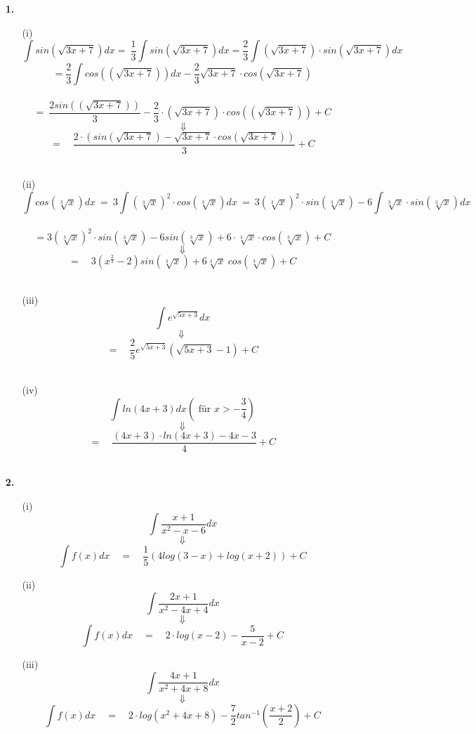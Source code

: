 \documentclass[a4paper,11pt]{article}
\title{\titleinfo}
\author{\authorinfotitle}
\date{\today}
\begin{document}
\maketitle
    \begin{enumerate}
        \item[\textbf{1.}]
         \begin{enumerate}
             \item[(i)]
            $$ \int sin \left( \sqrt{3x+7}\right)dx = \ \frac{1}{3} \int \! sin(\sqrt{3x+7})dx = \frac{2}{3} \int \! (\sqrt{3x+7}) \cdot sin (\sqrt{3x+7})dx $$$$ = \frac{2}{3} \int cos((\sqrt{3x+7}))dx - \frac{2}{3}\sqrt{3x+7} \cdot cos(\sqrt{3x+7}) $$\\$$ = \ \frac{2sin((\sqrt{3x+7}))}{3} - \frac{2}{3} \cdot (\sqrt{3x+7}) \cdot cos((\sqrt{3x+7})) + C $$$$ \ \Downarrow $$$$ = \quad \frac{2 \cdot (sin (\sqrt{3x+7})-\sqrt{3x+7} \cdot cos(\sqrt{3x+7}))}{3} + C $$ \\
            \item[(ii)]
            $$ \int cos \left( \sqrt[3]{x}\right)dx \ = \ 3 \int (\sqrt[3]{x})^2 \cdot cos(\sqrt[3]{x})dx \ = \ 3(\sqrt[3]{x})^2 \cdot sin(\sqrt[3]{x}) -6 \int \sqrt[3]{x} \cdot sin( \sqrt[3]{x})dx$$\\$$ = 3(\sqrt[3]{x})^2 \cdot sin(\sqrt[3]{x}) -6 sin(\sqrt[3]{x}) + 6 \cdot \sqrt[3]{x} \cdot cos(\sqrt[3]{x}) +C $$$$ \ \Downarrow \ $$$$ = \quad 3\left(x^{\frac{2}{3}}-2\right) sin\left(\sqrt[3]{x}\right) +6\sqrt[3]{x} \ cos\left(\sqrt[3]{x}\right) + C $$ \\
            \item[(iii)]
            $$ \int e^{\sqrt{5x+3}}dx $$$$ \Downarrow \ $$$$ = \quad \frac{2}{5}e^{\sqrt{5x+3}}(\sqrt{5x+3}-1) + C $$ \\
            \item[(iv)]
            $$ \int ln (4x+3)dx \left(\text{ für } x > - \frac{3}{4}\right)  $$$$\ \Downarrow \ $$$$  = \quad \frac{(4x+3) \cdot ln(4x+3) -4x -3}{4} + C $$ \\

         \end{enumerate}
              
        \item[\textbf{2.}]
        \begin{enumerate}
            \item[(i)]
             $$\int \frac{x+1}{x^2-x-6}dx $$$$ \Downarrow $$$$  \int f(x)dx \quad = \quad \frac{1}{5}(4log(3-x)+log(x+2)) +C $$ 
             \item[(ii)]
             $$ \int \frac{2x+1}{x^2-4x+4}dx $$$$ \Downarrow $$$$  \int f(x)dx \quad = \quad 2 \cdot log(x-2) - \frac{5}{x-2} + C $$ 
             \item[(iii)] 
             $$ \int \frac{4x+1}{x^2+4x+8}dx  $$$$ \Downarrow $$$$  \int f(x)dx \quad = \quad 2 \cdot log(x^2+4x+8) - \frac{7}{2}tan^{-1}\left(\frac{x+2}{2}\right) +C $$ \\


\end{enumerate}
\end{enumerate}
\end{document}
